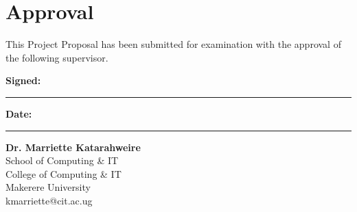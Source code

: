 \chapter*{Approval}


\vspace{0.3cm}


This Project Proposal has been submitted for examination with the approval of
the following supervisor.


\vspace{0.5cm} \noindent

\textbf{Signed:}\\
\rule{8cm}{0.4pt}


\vspace{0.3cm} \noindent

\textbf{Date:}\\
\rule{8cm}{0.4pt}


\vspace{0.5cm}

\noindent \textbf{Dr. Marriette Katarahweire} \\
School of Computing \& IT \\
College of Computing \& IT \\
Makerere University \\
kmarriette@cit.ac.ug






